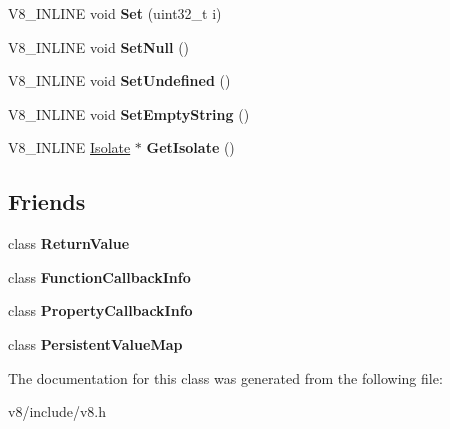\begin{DoxyCompactItemize}
\item 
\hypertarget{classv8_1_1ReturnValue_a9e190fff3c0396656e752ee916c715dc}{V8\-\_\-\-I\-N\-L\-I\-N\-E void {\bfseries Set} (uint32\-\_\-t i)}\label{classv8_1_1ReturnValue_a9e190fff3c0396656e752ee916c715dc}

\item 
\hypertarget{classv8_1_1ReturnValue_aba8480ee94ea905ad0850b3ceaf1b9b1}{V8\-\_\-\-I\-N\-L\-I\-N\-E void {\bfseries Set\-Null} ()}\label{classv8_1_1ReturnValue_aba8480ee94ea905ad0850b3ceaf1b9b1}

\item 
\hypertarget{classv8_1_1ReturnValue_af73d4ed15f126a214efe583ac56ff19d}{V8\-\_\-\-I\-N\-L\-I\-N\-E void {\bfseries Set\-Undefined} ()}\label{classv8_1_1ReturnValue_af73d4ed15f126a214efe583ac56ff19d}

\item 
\hypertarget{classv8_1_1ReturnValue_a3ed4f59f726eafae53525bb68512b93e}{V8\-\_\-\-I\-N\-L\-I\-N\-E void {\bfseries Set\-Empty\-String} ()}\label{classv8_1_1ReturnValue_a3ed4f59f726eafae53525bb68512b93e}

\item 
\hypertarget{classv8_1_1ReturnValue_a8744931ca4536bcc2f95e344072a3f03}{V8\-\_\-\-I\-N\-L\-I\-N\-E \hyperlink{classv8_1_1Isolate}{Isolate} $\ast$ {\bfseries Get\-Isolate} ()}\label{classv8_1_1ReturnValue_a8744931ca4536bcc2f95e344072a3f03}

\end{DoxyCompactItemize}
\subsection*{Friends}
\begin{DoxyCompactItemize}
\item 
\hypertarget{classv8_1_1ReturnValue_a861f1dd807b9cd4f8fd191af3071cf58}{class {\bfseries Return\-Value}}\label{classv8_1_1ReturnValue_a861f1dd807b9cd4f8fd191af3071cf58}

\item 
\hypertarget{classv8_1_1ReturnValue_a2eeeedafa5c14b8f1a3cba6edabc00c1}{class {\bfseries Function\-Callback\-Info}}\label{classv8_1_1ReturnValue_a2eeeedafa5c14b8f1a3cba6edabc00c1}

\item 
\hypertarget{classv8_1_1ReturnValue_aa6303a262b17c5cb7c7d2a6874f7ceb3}{class {\bfseries Property\-Callback\-Info}}\label{classv8_1_1ReturnValue_aa6303a262b17c5cb7c7d2a6874f7ceb3}

\item 
\hypertarget{classv8_1_1ReturnValue_aa96af8a34f1f35df272c683a483162da}{class {\bfseries Persistent\-Value\-Map}}\label{classv8_1_1ReturnValue_aa96af8a34f1f35df272c683a483162da}

\end{DoxyCompactItemize}


The documentation for this class was generated from the following file\-:\begin{DoxyCompactItemize}
\item 
v8/include/v8.\-h\end{DoxyCompactItemize}
